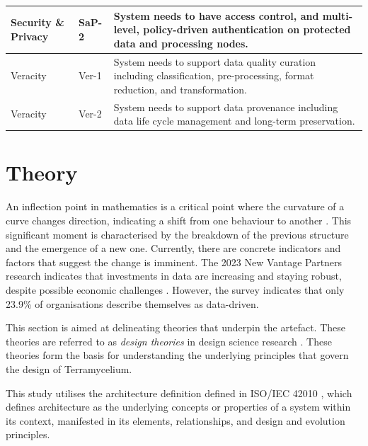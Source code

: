 \documentclass[review]{elsarticle}
\begin{document}
\begin{longtable}
\begin{tabular}{|l|l|p{10cm}|}
  \hline

  Security \& Privacy & SaP-2 & System needs to have access control, and multi-level, policy-driven authentication on protected data and processing nodes. \\

  \hline

  Veracity & Ver-1 & System needs to support data quality curation including classification, pre-processing, format reduction, and transformation. \\

  \hline

  Veracity & Ver-2 & System needs to support data provenance including data life cycle management and long-term preservation. \\

  \hline

  \end{tabular}

\end{longtable}

\section{Theory}

\label{sec:theory}

An inflection point in mathematics is a critical point where the curvature of a curve changes direction, indicating a shift from one behaviour to another \cite{inflectionPoint}. This significant moment is characterised by the breakdown of the previous structure and the emergence of a new one. Currently, there are concrete indicators and factors that suggest the change is imminent. The 2023 New Vantage Partners research indicates that investments in data are increasing and staying robust, despite possible economic challenges \cite{newvantagepartners2023}. However, the survey indicates that only 23.9\% of organisations describe themselves as data-driven. 

This section is aimed at delineating theories that underpin the artefact. These theories are referred to as \emph{design theories} in design science research \cite{Rose}. These theories form the basis for understanding the underlying principles that govern the design of Terramycelium.

This study utilises the architecture definition defined in ISO/IEC 42010 \cite{ISO42010}, which defines architecture as the underlying concepts or properties of a system within its context, manifested in its elements, relationships, and design and evolution principles.
\end{document}
